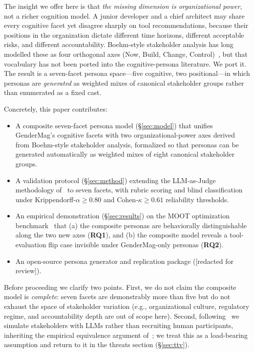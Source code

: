 \documentclass[10pt,conference]{IEEEtran}
\begin{document}
The insight we offer here is that \emph{the missing dimension is
organizational power}, not a richer cognition model. A junior developer and
a chief architect may share every cognitive facet yet disagree sharply on
tool recommendations, because their positions in the organization dictate
different time horizons, different acceptable risks, and different
accountability. Boehm-style stakeholder analysis has long modelled these as
four orthogonal axes (\textsf{Now}, \textsf{Build}, \textsf{Change},
\textsf{Control})~\cite{boehm2004valuebased,menzies2009value}, but that
vocabulary has not been ported into the cognitive-persona literature. We
port it. The result is a seven-facet persona space---five cognitive, two
positional---in which personas are \emph{generated} as weighted mixes of
canonical stakeholder groups rather than enumerated as a fixed cast.

Concretely, this paper contributes:
\begin{itemize}
  \item A composite seven-facet persona model (§\ref{sec:model}) that
    unifies GenderMag's cognitive facets with two organizational-power axes
    derived from Boehm-style stakeholder analysis, formalized so that
    personas can be generated automatically as weighted mixes of eight
    canonical stakeholder groups.
  \item A validation protocol (§\ref{sec:method}) extending the LLM-as-Judge
    methodology of~\cite{estes2026se4ai} to seven facets, with rubric scoring
    and blind classification under Krippendorff-$\alpha \ge 0.80$ and
    Cohen-$\kappa \ge 0.61$ reliability thresholds.
  \item An empirical demonstration (§\ref{sec:results}) on the MOOT
    optimization benchmark~\cite{menzies2025moot} that (a) the composite
    personas are behaviorally distinguishable along the two new axes
    (\textbf{RQ1}), and (b) the composite model reveals a tool-evaluation
    flip case invisible under GenderMag-only personas (\textbf{RQ2}).
  \item An open-source persona generator and replication package
    (\textsf{[redacted for review]}).
\end{itemize}

Before proceeding we clarify two points. First, we do not claim the composite
model is \emph{complete}: seven facets are demonstrably more than five but do
not exhaust the space of stakeholder variation (e.g., organizational culture,
regulatory regime, and accountability depth are out of scope here).
Second, following~\cite{estes2026se4ai} we simulate stakeholders with LLMs
rather than recruiting human participants, inheriting the empirical
equivalence argument of~\cite{schuller2024personas}; we treat this as a
load-bearing assumption and return to it in the threats section
(§\ref{sec:ttv}).
\end{document}
